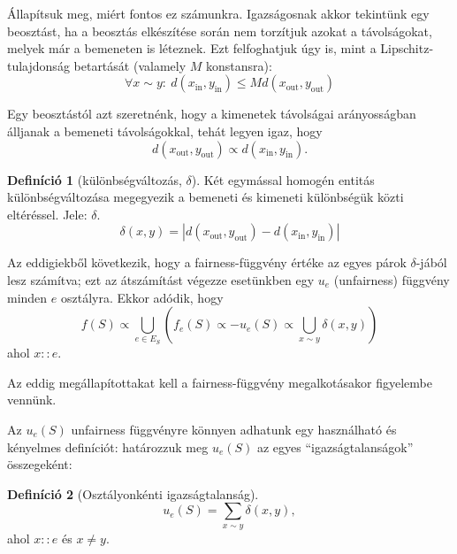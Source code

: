 \documentclass[twocolumn]{article}
\theoremstyle{definition}
\newtheorem{definition}{Definíció}[section]
\newcommand{\subin}[1]{ {#1}_{\text{in}} }
\newcommand{\subout}[1]{ {#1}_{\text{out}} }
\begin{document}
    Állapítsuk meg, miért fontos ez számunkra. Igazságosnak akkor tekintünk egy beosztást, ha a beosztás elkészítése során nem torzítjuk azokat a távolságokat, melyek már a bemeneten is léteznek. Ezt felfoghatjuk úgy is, mint a Lipschitz-tulajdonság betartását (valamely $M$ konstansra):
    \begin{equation}
        \forall x \sim y : \ d(\subin{x}, \subin{y}) \leq Md(\subout{x}, \subout{y})
    \end{equation}
    
    Egy beosztástól azt szeretnénk, hogy a kimenetek távolságai arányosságban álljanak a bemeneti távolságokkal, tehát legyen igaz, hogy
    \begin{equation}
        d(\subout x, \subout y) \propto d(\subin x, \subin y).
    \end{equation}
    
    \begin{definition}[különbségváltozás, $\delta$]
        Két egymással homogén entitás különbségváltozása megegyezik a bemeneti és kimeneti különbségük közti eltéréssel. Jele: $\delta$.
        \begin{equation}
            \delta(x, y) = |d(\subout x, \subout y) - d(\subin x, \subin y)|
        \end{equation}
    \end{definition}

    Az eddigiekből következik, hogy a fairness-függvény értéke az egyes párok $\delta$-jából lesz számítva; ezt az átszámítást végezze esetünkben egy $u_e$ (unfairness) függvény minden $e$ osztályra. Ekkor adódik, hogy
    \begin{equation}
        f(S) \propto \bigcup_{e \in E_S} \left( f_e(S) \propto -u_e(S) \propto \bigcup_{x \sim y} \delta(x, y) \right)
    \end{equation}
    ahol $x::e$.
    
    Az eddig megállapítottakat kell a fairness-függvény megalkotásakor figyelembe vennünk.
    
    Az $u_e(S)$ unfairness függvényre könnyen adhatunk egy használható és kényelmes definíciót: határozzuk meg $u_e(S)$ az egyes \enquote{igazságtalanságok} összegeként:
    \begin{definition}[Osztályonkénti igazságtalanság]
        \begin{equation}
            u_e(S) = \sum_{x \sim y} \delta(x, y),
        \end{equation}
        ahol $x::e$ és $x \neq y$.        
    \end{definition}
\end{document}
